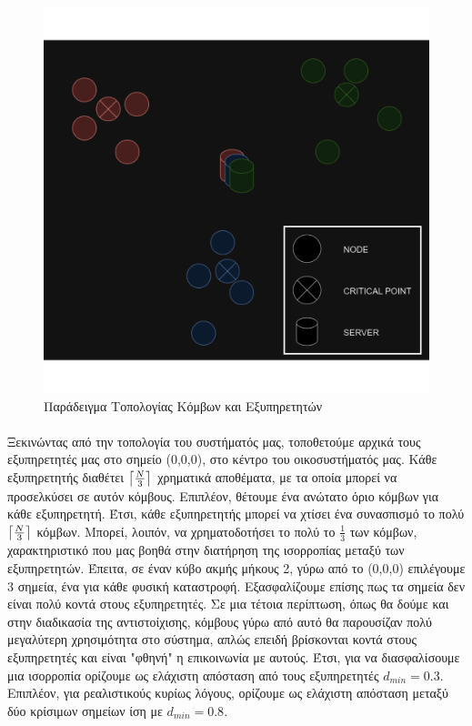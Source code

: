 \begin{figure}[ht]
    \centering
    \includegraphics[width=\textwidth]{figures/chapter1/topology+ypomn.png}
    \vspace{-1cm}
    \caption{Παράδειγμα Τοπολογίας Κόμβων και Εξυπηρετητών}
    \label{fig46}
\end{figure}

\vspace{-0.5cm}

\paragraph{} Ξεκινώντας από την τοπολογία του συστήματός μας, τοποθετούμε αρχικά τους εξυπηρετητές μας στο σημείο (0,0,0), στο κέντρο του οικοσυστήματός μας. Κάθε εξυπηρετητής διαθέτει $\ceil*{\frac{N}{3}}$ χρηματικά αποθέματα, με τα οποία μπορεί να προσελκύσει σε αυτόν κόμβους. Επιπλέον, θέτουμε ένα ανώτατο όριο κόμβων για κάθε εξυπηρετητή. Έτσι, κάθε εξυπηρετητής μπορεί να χτίσει ένα συνασπισμό το πολύ $\ceil*{\frac{N}{3}}$ κόμβων. Μπορεί, λοιπόν, να χρηματοδοτήσει το πολύ το $\frac{1}{3}$ των κόμβων, χαρακτηριστικό που μας βοηθά στην διατήρηση της ισορροπίας μεταξύ των εξυπηρετητών. Έπειτα, σε έναν κύβο ακμής μήκους 2, γύρω από το (0,0,0) επιλέγουμε 3 σημεία, ένα για κάθε φυσική καταστροφή. Εξασφαλίζουμε επίσης πως τα σημεία δεν είναι πολύ κοντά στους εξυπηρετητές. Σε μια τέτοια περίπτωση, όπως θα δούμε και στην διαδικασία της αντιστοίχισης, κόμβους γύρω από αυτό θα παρουσίζαν πολύ μεγαλύτερη χρησιμότητα στο σύστημα, απλώς επειδή βρίσκονται κοντά στους εξυπηρετητές και είναι "φθηνή" η επικοινωνία με αυτούς. Έτσι, για να διασφαλίσουμε μια ισορροπία ορίζουμε ως ελάχιστη απόσταση από τους εξυπηρετητές $d_{min} = 0.3$. Επιπλέον, για ρεαλιστικούς κυρίως λόγους, ορίζουμε ως ελάχιστη απόσταση μεταξύ δύο κρίσιμων σημείων ίση με $d_{min} = 0.8$. 

